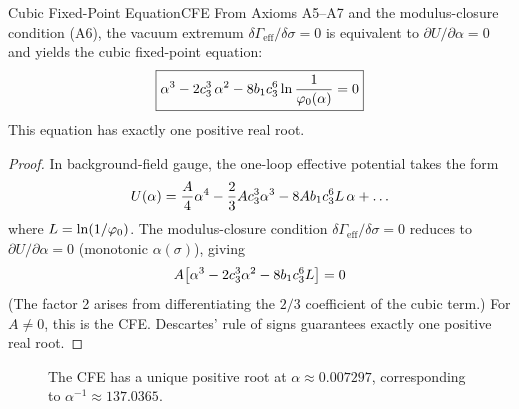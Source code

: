\begin{theorem}{Cubic Fixed-Point Equation}{CFE}
From Axioms A5--A7 and the modulus-closure condition (A6), the vacuum extremum
$\delta\Gamma_{\mathrm{eff}}/\delta\sigma=0$ is equivalent to $\partial U/\partial\alpha = 0$
and yields the cubic fixed-point equation:
\begin{equation}
    \boxed{\alpha^3 - 2c_3^3\,\alpha^2 - 8b_1c_3^6\ln\frac{1}{\varphi_0(\alpha)} = 0}
    \label{eq:CFE}
\end{equation}
This equation has exactly one positive real root.
\end{theorem}

\begin{proof}
In background-field gauge, the one-loop effective potential takes the form
\begin{equation}
    U(\alpha) = \frac{A}{4}\alpha^4 - \frac{2}{3}Ac_3^3\alpha^3 - 8Ab_1c_3^6 L\,\alpha + \ldots
\end{equation}
where $L = \ln(1/\varphi_0)$. The modulus-closure condition 
$\delta\Gamma_{\mathrm{eff}}/\delta\sigma = 0$ reduces to $\partial U/\partial\alpha = 0$
(monotonic $\alpha(\sigma)$), giving
\begin{equation}
    A\bigl[\alpha^3 - 2c_3^3\alpha^2 - 8b_1c_3^6 L\bigr] = 0
\end{equation}
(The factor 2 arises from differentiating the $2/3$ coefficient of the cubic term.)
For $A \neq 0$, this is the CFE. Descartes' rule of signs guarantees exactly 
one positive real root.
\end{proof}

\begin{figure}[H]
\centering
{}
\caption{The CFE has a unique positive root at $\alpha \approx 0.007297$, 
corresponding to $\alpha^{-1} \approx 137.0365$.}
\label{fig:CFE}
\end{figure}

